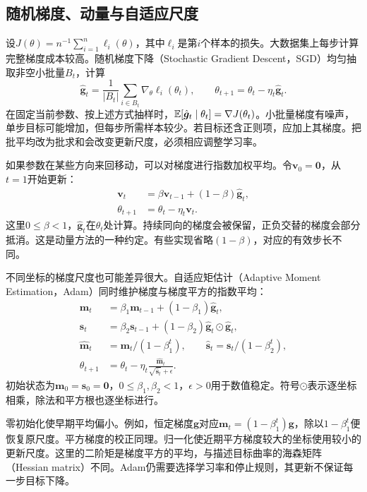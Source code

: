 \subsection{随机梯度、动量与自适应尺度}
设$J(\theta)=n^{-1}\sum_{i=1}^n\ell_i(\theta)$，其中$\ell_i$是第$i$个样本的损失。大数据集上每步计算完整梯度成本较高。随机梯度下降（Stochastic Gradient Descent，SGD）均匀抽取非空小批量$B_t$，计算
\begin{equation}
 \hat{\bm g}_t=\frac{1}{|B_t|}\sum_{i\in B_t}\nabla_\theta\ell_i(\theta_t),
 \qquad \theta_{t+1}=\theta_t-\eta_t\hat{\bm g}_t.
 \label{eq:solving-sgd}
\end{equation}
在固定当前参数、按上述方式抽样时，$\mathbb{E}[\hat{\bm g}_t\mid\theta_t]=\nabla J(\theta_t)$。小批量梯度有噪声，单步目标可能增加，但每步所需样本较少。若目标还含正则项，应加上其梯度。把批平均改为批求和会改变更新尺度，必须相应调整学习率。

如果参数在某些方向来回移动，可以对梯度进行指数加权平均。令$\bm v_0=\bm0$，从$t=1$开始更新：
\begin{align}
 \bm v_t&=\beta\bm v_{t-1}+(1-\beta)\hat{\bm g}_t,\\
 \theta_{t+1}&=\theta_t-\eta_t\bm v_t.
\end{align}
这里$0\leq\beta<1$，$\hat{\bm g}_t$在$\theta_t$处计算。持续同向的梯度会被保留，正负交替的梯度会部分抵消。这是动量方法的一种约定。有些实现省略$(1-\beta)$，对应的有效步长不同。

不同坐标的梯度尺度也可能差异很大。自适应矩估计（Adaptive Moment Estimation，Adam）同时维护梯度与梯度平方的指数平均\cite{kingma2015adam}：
\begin{align}
 \bm m_t&=\beta_1\bm m_{t-1}+(1-\beta_1)\hat{\bm g}_t,\\
 \bm s_t&=\beta_2\bm s_{t-1}+(1-\beta_2)\hat{\bm g}_t\odot\hat{\bm g}_t,\\
 \hat{\bm m}_t&=\bm m_t/(1-\beta_1^t),\qquad
 \hat{\bm s}_t=\bm s_t/(1-\beta_2^t),\\
 \theta_{t+1}&=\theta_t-\eta_t\frac{\hat{\bm m}_t}{\sqrt{\hat{\bm s}_t}+\epsilon}.
 \label{eq:solving-adam}
\end{align}
初始状态为$\bm m_0=\bm s_0=\bm0$，$0\leq\beta_1,\beta_2<1$，$\epsilon>0$用于数值稳定。符号$\odot$表示逐坐标相乘，除法和平方根也逐坐标进行。

零初始化使早期平均偏小。例如，恒定梯度$\bm g$对应$\bm m_t=(1-\beta_1^t)\bm g$，除以$1-\beta_1^t$便恢复原尺度。平方梯度的校正同理。归一化使近期平方梯度较大的坐标使用较小的更新尺度。这里的二阶矩是梯度平方的平均，与描述目标曲率的海森矩阵（Hessian matrix）不同。Adam仍需要选择学习率和停止规则，其更新不保证每一步目标下降。

